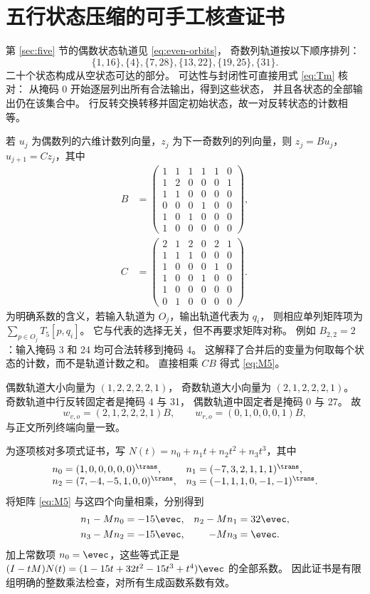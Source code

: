 \section{五行状态压缩的可手工核查证书}\label{app:certificate}

第 \ref{sec:five} 节的偶数状态轨道见 \eqref{eq:even-orbits}，
奇数列轨道按以下顺序排列：
\[
 \{1,16\},\{4\},\{7,28\},\{13,22\},\{19,25\},\{31\}.
\]
二十个状态构成从空状态可达的部分。
可达性与封闭性可直接用式 \eqref{eq:Tm} 核对：
从掩码 0 开始逐层列出所有合法输出，得到这些状态，
并且各状态的全部输出仍在该集合中。
行反转交换转移并固定初始状态，故一对反转状态的计数相等。

若 $u_j$ 为偶数列的六维计数列向量，$z_j$ 为下一奇数列的列向量，则
$z_j=Bu_j$，$u_{j+1}=Cz_j$，其中
\begin{equation}\label{eq:BC}
\begin{split}
 B&=\begin{pmatrix}
1&1&1&1&1&0\\
1&2&0&0&0&1\\
1&1&0&0&0&0\\
0&0&0&1&0&0\\
1&0&1&0&0&0\\
1&0&0&0&0&0
\end{pmatrix},\\[4pt]
 C&=\begin{pmatrix}
2&1&2&0&2&1\\
1&1&1&0&0&0\\
1&0&0&0&1&0\\
1&0&0&1&0&0\\
1&0&0&0&0&0\\
0&1&0&0&0&0
\end{pmatrix}.
\end{split}
\end{equation}
为明确系数的含义，若输入轨道为 $O_j$，输出轨道代表为 $q_i$，
则相应单列矩阵项为 $\sum_{p\in O_j}T_5[p,q_i]$。
它与代表的选择无关，但不再要求矩阵对称。
例如 $B_{2,2}=2$：输入掩码 3 和 24 均可合法转移到掩码 4。
这解释了合并后的变量为何取每个状态的计数，而不是轨道计数之和。
直接相乘 $CB$ 得式 \eqref{eq:M5}。

偶数轨道大小向量为 $(1,2,2,2,2,1)$，
奇数轨道大小向量为 $(2,1,2,2,2,1)$。
奇数轨道中行反转固定者是掩码 4 与 31，
偶数轨道中固定者是掩码 0 与 27。
故
\[
 w_{v,o}=(2,1,2,2,2,1)B,\qquad
 w_{r,o}=(0,1,0,0,0,1)B,
\]
与正文所列终端向量一致。

为逐项核对多项式证书，写 $N(t)=n_0+n_1t+n_2t^2+n_3t^3$，其中
\[
\begin{array}{ll}
n_0=(1,0,0,0,0,0)^{\trans},&
n_1=(-7,3,2,1,1,1)^{\trans},\\
n_2=(7,-4,-5,1,0,0)^{\trans},&
n_3=(-1,1,1,0,-1,-1)^{\trans}.
\end{array}
\]
将矩阵 \eqref{eq:M5} 与这四个向量相乘，分别得到
\[
\begin{aligned}
n_1-Mn_0&=-15\evec,&
n_2-Mn_1&=32\evec,\\
n_3-Mn_2&=-15\evec,&
-Mn_3&=\evec.
\end{aligned}
\]
加上常数项 $n_0=\evec$，这些等式正是
$(I-tM)N(t)=(1-15t+32t^2-15t^3+t^4)\evec$ 的全部系数。
因此证书是有限组明确的整数乘法检查，对所有生成函数系数有效。
